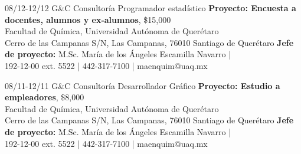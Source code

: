 \documentclass[]{friggeri-cv}
\begin{document}
\begin{entrylist}
\entry
{08/12-12/12}
{G\&C Consultor\'{i}a}
{Programador estad\'{i}stico}
{\textbf{Proyecto: Encuesta a docentes, alumnos y ex-alumnos}, \$15,000\\
Facultad de Qu\'{i}mica, Universidad Aut\'{o}noma de Quer\'{e}taro\\
Cerro de las Campanas S/N, Las Campanas, 76010 Santiago de Quer\'{e}taro
\textbf{Jefe de proyecto:} M.Sc. Mar\'{i}a de los \'{A}ngeles Escamilla Navarro | \\
192-12-00 ext. 5522 | 442-317-7100 | maenquim@uaq.mx}


\entry
{08/11-12/11}
{G\&C Consultor\'{i}a}
{Desarrollador Gr\'{a}fico}
{\textbf{Proyecto: Estudio a empleadores}, \$8,000\\
Facultad de Qu\'{i}mica, Universidad Aut\'{o}noma de Quer\'{e}taro\\
Cerro de las Campanas S/N, Las Campanas, 76010 Santiago de Quer\'{e}taro
\textbf{Jefe de proyecto:} M.Sc. Mar\'{i}a de los \'{A}ngeles Escamilla Navarro | \\
192-12-00 ext. 5522 | 442-317-7100 | maenquim@uaq.mx}
%
\end{entrylist}
\end{document}
